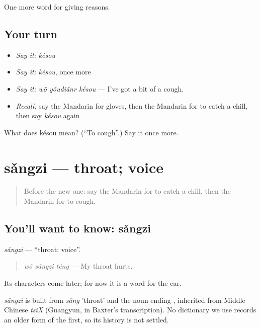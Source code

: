\begin{grammarlens}[title={What you've built}]
One more word for giving reasons.
\end{grammarlens}

\subsection*{Your turn}
\begin{itemize}
\raggedright
  \item \emph{Say it:} \emph{késou}
  \item \emph{Say it:} \emph{késou}, once more
  \item \emph{Say it:} \emph{wǒ yǒudiǎnr késou} — I've got a bit of a cough.
  \item \emph{Recall:} say the Mandarin for gloves, then the Mandarin for to catch a chill, then say \emph{késou} again
\end{itemize}

\begin{tcolorbox}[breakable,colback=teal!4,colframe=teal!35!black,title={Before you move on}]
What does késou mean? (\textquotedblleft{}To cough\textquotedblright{}.) Say it once more.
\end{tcolorbox}
\section[sǎngzi]{sǎngzi — throat; voice}

\label{lesson:ZH-C222-sangzi}



\begin{quote}
Before the new one: say the Mandarin for to catch a chill, then the Mandarin for to cough.
\end{quote}

\subsection*{You'll want to know: sǎngzi}
\emph{sǎngzi} — \textquotedblleft{}throat; voice\textquotedblright{}.

\begin{quote}
\emph{wǒ sǎngzi téng} — My throat hurts.
\end{quote}

Its characters come later; for now it is a word for the ear.

\begin{cousinweb}
\emph{sǎngzi} is built from \emph{sǎng} 'throat' and the noun ending , inherited from Middle Chinese \emph{tsiX} (Guangyun, in Baxter's transcription). No dictionary we use records an older form of the first, so its history is not settled.
\end{cousinweb}

